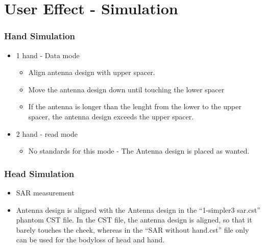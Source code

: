 \section{User Effect - Simulation}


\subsubsection{Hand Simulation}
\begin{itemize}
\item 1 hand - Data mode
\begin{itemize}
\item Align antenna design with upper spacer.
\item Move the antenna design down until touching the lower spacer
\item If the antenna is longer than the lenght from the lower to the upper spacer, the antenna design exceeds the upper spacer.
\end{itemize}
\item 2 hand - read mode
\begin{itemize}
\item No standards for this mode - The Antenna design is placed as wanted.  
\end{itemize}
\end{itemize}

\subsubsection{Head Simulation}
\begin{itemize}
\item SAR measurement
\item Antenna design is aligned with the Antenna design in the ``1-simpler3 sar.cst'' phantom CST file. In the CST file, the antenna design is aligned, so that it barely touches the cheek, whereas in the ``SAR without hand.cst'' file only can be used for the bodyloss of head and hand.
\end{itemize}
